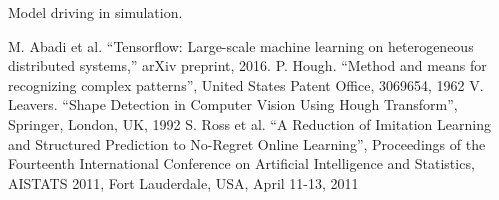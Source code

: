 \documentclass[conference]{IEEEtran}
\begin{document}
\begin{video}[!t]
	\caption{Model driving in simulation.}
	\label{vid:model}
\end{video}

\begin{thebibliography}{00}
	
 M. Abadi et al. ``Tensorflow: Large-scale machine learning on heterogeneous distributed systems,'' arXiv preprint, 2016.
 P. Hough. ``Method and means for recognizing complex patterns'', United States Patent Office, 3069654, 1962
 V. Leavers. ``Shape Detection in Computer Vision Using Hough Transform'', Springer, London, UK, 1992
 S. Ross et al. ``A Reduction of Imitation Learning and Structured Prediction to No-Regret Online Learning'', Proceedings of the Fourteenth International Conference on Artificial Intelligence and Statistics, {AISTATS} 2011, Fort Lauderdale, USA, April 11-13, 2011
\end{thebibliography}
\end{document}
